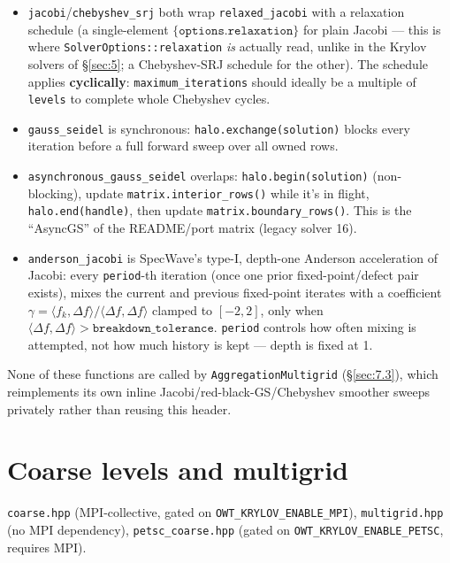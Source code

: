 \documentclass[11pt,a4paper]{report}
\newcommand{\secref}[1]{\S\ref{#1}}
\begin{document}
\begin{itemize}
\item \lstinline!jacobi!/\lstinline!chebyshev_srj! both wrap \lstinline!relaxed_jacobi! with
  a relaxation schedule (a single-element $\{\mathtt{options.relaxation}\}$
  for plain Jacobi --- this is where \lstinline!SolverOptions::relaxation!
  \emph{is} actually read, unlike in the Krylov solvers of
  \secref{sec:5}; a Chebyshev-SRJ schedule for the other). The
  schedule applies \textbf{cyclically}: \lstinline!maximum_iterations! should
  ideally be a multiple of \lstinline!levels! to complete whole Chebyshev
  cycles.
\item \lstinline!gauss_seidel! is synchronous: \lstinline!halo.exchange(solution)!
  blocks every iteration before a full forward sweep over all owned
  rows.
\item \lstinline!asynchronous_gauss_seidel! overlaps: \lstinline!halo.begin(solution)!
  (non-blocking), update \lstinline!matrix.interior_rows()! while it's in
  flight, \lstinline!halo.end(handle)!, then update \lstinline!matrix.boundary_rows()!.
  This is the ``AsyncGS'' of the README/port matrix (legacy solver
  16).
\item \lstinline!anderson_jacobi! is SpecWave's type-I, depth-one Anderson
  acceleration of Jacobi: every \lstinline!period!-th iteration (once one
  prior fixed-point/defect pair exists), mixes the current and
  previous fixed-point iterates with a coefficient
  $\gamma = \langle f_k,\Delta f\rangle / \langle \Delta f,\Delta f\rangle$
  clamped to $[-2,2]$, only when
  $\langle \Delta f,\Delta f\rangle > \mathtt{breakdown\_tolerance}$.
  \lstinline!period! controls how often mixing is attempted, not how much
  history is kept --- depth is fixed at 1.
\end{itemize}

None of these functions are called by \lstinline!AggregationMultigrid!
(\secref{sec:7.3}), which reimplements its own inline
Jacobi/red-black-GS/Chebyshev smoother sweeps privately rather than
reusing this header.

\chapter{Coarse levels and multigrid}
\label{sec:7}

\texttt{coarse.hpp} (MPI-collective, gated on \lstinline!OWT_KRYLOV_ENABLE_MPI!),
\texttt{multigrid.hpp} (no MPI dependency), \texttt{petsc\_coarse.hpp}
(gated on \lstinline!OWT_KRYLOV_ENABLE_PETSC!, requires MPI).
\end{document}
